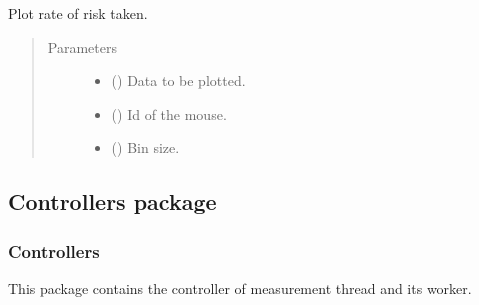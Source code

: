 \documentclass[letterpaper,10pt,english]{sphinxmanual}
\begin{document}
\begin{fulllineitems}
\label{\detokenize{NoSeMazeController/Analysis:Analysis.Performance.show_total_risk}}
\pysigstartsignatures
{}
\pysigstopsignatures
\sphinxAtStartPar
Plot rate of risk taken.
\begin{quote}\begin{description}
\item[{Parameters}] \leavevmode\begin{itemize}
\item {} 
\sphinxAtStartPar
{} () \textendash{} Data to be plotted.

\item {} 
\sphinxAtStartPar
{} () \textendash{} Id of the mouse.

\item {} 
\sphinxAtStartPar
{} () \textendash{} Bin size.

\end{itemize}

\end{description}\end{quote}

\end{fulllineitems}


\sphinxstepscope


\subsection{Controllers package}
\label{\detokenize{NoSeMazeController/Controllers:controllers-package}}\label{\detokenize{NoSeMazeController/Controllers::doc}}

\subsubsection{Controllers}
\label{\detokenize{NoSeMazeController/Controllers:controllers}}
\sphinxAtStartPar
This package contains the controller of measurement thread and its worker.
\end{document}
